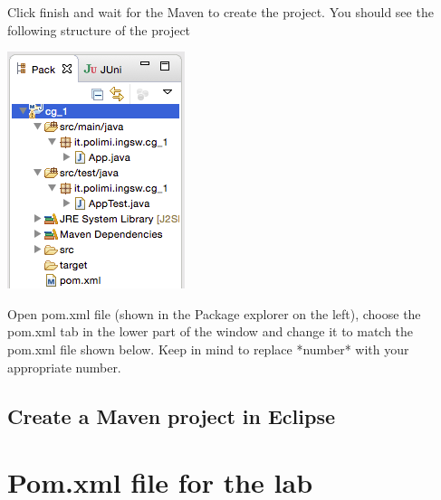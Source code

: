 \documentclass{article}
\begin{document}
\begin{compactitem}
\begin{center}
\end{center}
\item Click finish and wait for the Maven to create the project. You
  should see the following structure of the project 
\begin{center}
\includegraphics[scale=0.5]{figures/4}
\end{center}
\item Open pom.xml file (shown in the Package explorer on the left),
  choose the pom.xml tab in the lower part of the window and change it
  to match the pom.xml file shown below. Keep in mind to replace
  *number* with your appropriate number.
\end{compactitem}

\subsection{Create a Maven project in Eclipse}

\section{Pom.xml file for the lab}
\end{document}
